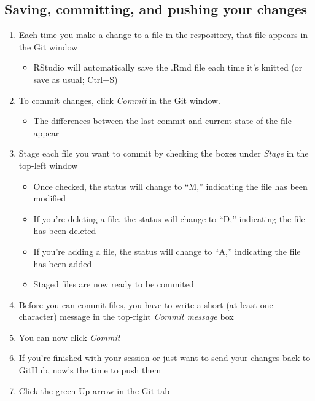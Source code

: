 \documentclass[12pt,]{article}
\providecommand{\tightlist}{%
  \setlength{\itemsep}{0pt}\setlength{\parskip}{0pt}}
\begin{document}
\subsection{Saving, committing, and pushing your
changes}\label{saving-committing-and-pushing-your-changes}

\begin{enumerate}
\def\labelenumi{\arabic{enumi}.}
\item
  Each time you make a change to a file in the respository, that file
  appears in the Git window

  \begin{itemize}
  \tightlist
  \item
    RStudio will automatically save the .Rmd file each time it's knitted
    (or save as usual; Ctrl+S)
  \end{itemize}
\item
  To commit changes, click \emph{Commit} in the Git window.

  \begin{itemize}
  \tightlist
  \item
    The differences between the last commit and current state of the
    file appear
  \end{itemize}
\item
  Stage each file you want to commit by checking the boxes under
  \emph{Stage} in the top-left window

  \begin{itemize}
  \tightlist
  \item
    Once checked, the status will change to ``M,'' indicating the file
    has been modified
  \item
    If you're deleting a file, the status will change to ``D,''
    indicating the file has been deleted
  \item
    If you're adding a file, the status will change to ``A,'' indicating
    the file has been added
  \item
    Staged files are now ready to be commited
  \end{itemize}
\item
  Before you can commit files, you have to write a short (at least one
  character) message in the top-right \emph{Commit message} box
\item
  You can now click \emph{Commit}
\item
  If you're finished with your session or just want to send your changes
  back to GitHub, now's the time to push them
\item
  Click the green Up arrow in the Git tab


\end{enumerate}
\end{document}

